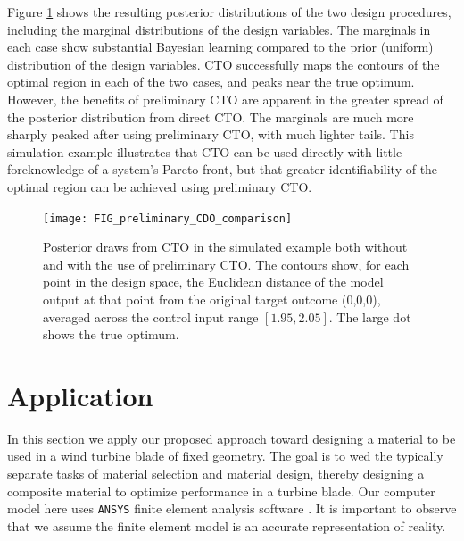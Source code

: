 \documentclass[12pt]{article}
\begin{document}
%
Figure \ref{fig:toy_sim_results} shows the resulting posterior distributions of the two design procedures, including the marginal distributions of the design variables. 
%
The marginals in each case show substantial Bayesian learning compared to the prior (uniform) distribution of the design variables. 
%
CTO successfully maps the contours of the optimal region in each of the two cases, and peaks near the true optimum. 
%
However, the benefits of preliminary CTO are apparent in the greater spread of the posterior distribution from direct CTO.
%
The marginals are much more sharply peaked after using preliminary CTO, with much lighter tails.
%
%
This simulation example illustrates that CTO can be used directly with little foreknowledge of a system's Pareto front, but that greater identifiability of the optimal region can be achieved using preliminary CTO.

\begin{figure}
\centering
\texttt{[image: FIG\_preliminary\_CDO\_comparison]}
\caption{Posterior draws from CTO in the simulated example both without and with the use of preliminary CTO. The contours show, for each point in the design space, the Euclidean distance of the model output at that point from the original target outcome (0,0,0), averaged across the control input range $[1.95,2.05]$. The large dot shows the true optimum.}
\label{fig:toy_sim_results}
\end{figure}



\section{Application}\label{application}

In this section we apply our proposed approach toward designing a material to be used in a wind turbine blade of fixed geometry. 
%
The goal is to wed the typically separate tasks of material selection and material design, thereby designing a composite material to optimize performance in a turbine blade.
%
Our computer model here uses \texttt{ANSYS} finite element analysis software \citep{ansys}. 
It is important to observe that we assume the finite element model is an accurate representation of reality.
\end{document}
